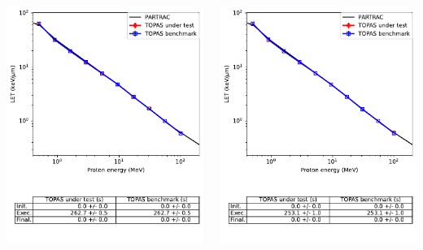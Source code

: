 \documentclass[aspectratio=1610]{beamer}
\begin{document}
\begin{frame}{\secname}
  \begin{columns}
    \begin{column}{0.4\linewidth}
     \includegraphics[width=\textwidth]{./LET/LET_TsEmDNAPhysics}
    \end{column}
    \begin{column}{0.4\linewidth} 
     \includegraphics[width=\textwidth]{./LET/LET_g4em-dna_opt2}

\end{column}
\end{columns}
\end{frame}
\end{document}
